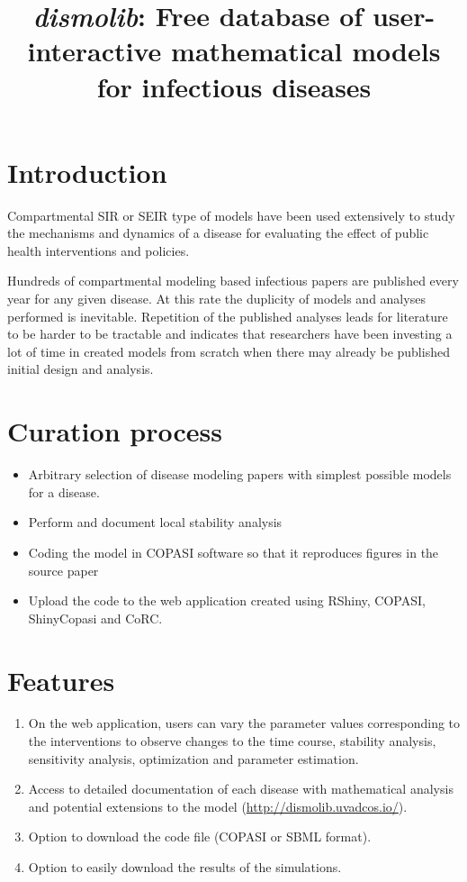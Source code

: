 \documentclass{article}
\title{\textit{dismolib}: Free database of user-interactive mathematical models for infectious diseases}
\author{}
\date{}
\begin{document}
\maketitle

\section{Introduction}
Compartmental SIR or SEIR type of models have been used extensively to study the mechanisms and dynamics of a disease for evaluating the effect of public health interventions and policies. 

Hundreds of compartmental modeling based infectious papers are published every year for any given disease. At this rate the duplicity of models and analyses performed is inevitable. Repetition of the published analyses leads for literature to be harder to be tractable and indicates that researchers have been investing a lot of time in created models from scratch when there may already be published initial design and analysis.





\section{Curation process}
\begin{itemize}
    \item Arbitrary selection of disease modeling papers with simplest possible models for a disease.
    \item Perform and document local stability analysis
    \item Coding the model in COPASI software so that it reproduces figures in the source paper
    \item Upload the code to the web application created using RShiny, COPASI, ShinyCopasi and CoRC.
\end{itemize}


\section{Features}
\begin{enumerate}
    \item On the web application, users can vary the parameter values corresponding to the interventions to observe changes to the time course, stability analysis, sensitivity analysis, optimization and parameter estimation.
    \item Access to detailed documentation of each disease with mathematical analysis and potential extensions to the model (\url{http://dismolib.uvadcos.io/}).
    \item Option to download the code file (COPASI or SBML format).
    \item Option to easily download the results of the simulations.
\end{enumerate}
\end{document}
